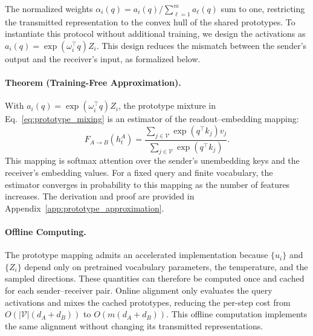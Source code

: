 \documentclass[11pt]{article}
\begin{document}
The normalized weights $\alpha_i(q)=a_i(q)/\sum_{\ell=1}^{m}a_\ell(q)$ sum to one, restricting the transmitted representation to the convex hull of the shared prototypes. To instantiate this protocol without additional training, we design the activations as $a_i(q)=\exp(\omega_i^\top q)Z_i$. This design reduces the mismatch between the sender's output and the receiver's input, as formalized below.

\paragraph{Theorem (Training-Free Approximation).}
With $a_i(q)=\exp(\omega_i^\top q)Z_i$, the prototype mixture in Eq.~\ref{eq:prototype_mixing} is an estimator of the readout--embedding mapping:
\begin{equation}
    F_{A\rightarrow B}(h_t^A)
    =\frac{\sum_{j\in\mathcal{V}}\exp(q^\top k_j)v_j}
           {\sum_{j\in\mathcal{V}}\exp(q^\top k_j)}.
\label{eq:prototype_attention_target}
\end{equation}
This mapping is softmax attention over the sender's unembedding keys and the receiver's embedding values. For a fixed query and finite vocabulary, the estimator converges in probability to this mapping as the number of features increases. The derivation and proof are provided in Appendix~\ref{app:prototype_approximation}.

\paragraph{Offline Computing.}
The prototype mapping admits an accelerated implementation because $\{u_i\}$ and $\{Z_i\}$ depend only on pretrained vocabulary parameters, the temperature, and the sampled directions. These quantities can therefore be computed once and cached for each sender--receiver pair. Online alignment only evaluates the query activations and mixes the cached prototypes, reducing the per-step cost from $O(|\mathcal{V}|(d_A+d_B))$ to $O(m(d_A+d_B))$. This offline computation implements the same alignment without changing its transmitted representations.
\end{document}
